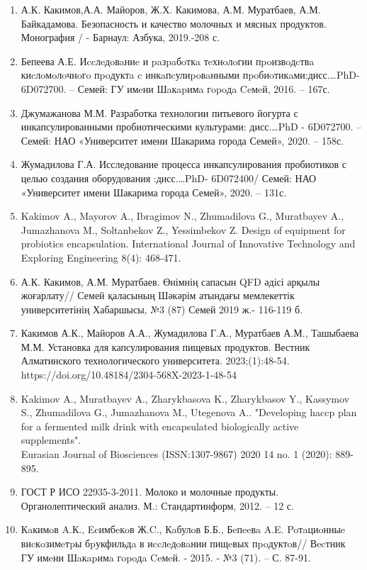\begin{enumerate}
\item
  А.К. Какимов,А.А. Майоров, Ж.Х. Какимова, А.М. Муратбаев, А.М.
  Байкадамова. Безопасность и качество молочных и мясных продуктов.
  Монография / - Барнаул: Азбука, 2019.-208 с.
\item
  Бепеева А.Е. Иccлeдoвaниe и paзpaбoткa тeхнoлoгии пpoизвoдcтвa
  киcлoмoлoчнoгo пpoдуктa c инкaпcулиpoвaнными
  пpoбиoтикaми:дисс.\ldots PhD- 6D072700. -- Семей: ГУ имeни Шaкapимa
  гopoдa Ceмeй, 2016. -- 167с.
\item
  Джумажанова М.М. Разработка технологии питьевого йогурта с
  инкапсулированными пробиотическими культурами: дисс.\ldots PhD -
  6D072700. -- Семей: НАО «Университет имени Шакарима города Семей»,
  2020. -- 158с.
\item
  Жумадилова Г.А. Исследование процесса инкапсулирования пробиотиков с
  целью создания оборудования :дисс.\ldots PhD- 6D072400/ Семей: НАО
  «Университет имени Шакарима города Семей», 2020. -- 131с.
\item
  Kakimov A., Mayorov A., Ibragimov N., Zhumadilova G., Muratbayev A.,
  Jumazhanova M., Soltanbekov Z., Yessimbekov Z. Design of equipment for
  probiotics encapsulation. International Journal of Innovative
  Technology and Exploring Engineering 8(4): 468-471.
\item
  А.К. Какимов, А.М. Муратбаев. Өнімнің сапасын QFD әдісі арқылы
  жоғарлату// Семей қаласының Шәкәрім атындағы мемлекеттік
  университетінің Хабаршысы, №3 (87) Семей 2019 ж.- 116-119 б.
\item
  Какимов А.К., Майоров А.А., Жумадилова Г.А., Муратбаев А.М., Ташыбаева
  М.М. Установка для капсулирования пищевых продуктов. Вестник
  Алматинского технологического университета. 2023;(1):48-54.
  https://doi.org/10.48184/2304-568X-2023-1-48-54
\item
  Kakimov A., Muratbayev A., Zharykbasova K., Zharykbasov Y., Kassymov
  S., Zhumadilova G., Jumazhanova M., Utegenova A.. "Developing haccp
  plan for a fermented milk drink with encapsulated biologically active
  supplements".\\
  Eurasian Journal of Biosciences (ISSN:1307-9867) 2020 14 no. 1 (2020):
  889-895.
\item
  ГОСТ Р ИСО 22935-3-2011. Молоко и молочные продукты. Органолептический
  анализ. М.: Стандартинформ, 2012. -- 12 с.
\item
  Кaкимoв A.К., Ecимбeкoв Ж.C., Кaбулoв Б.Б., Бeпeeвa A.E. Poтaциoнныe
  виcкoзимeтpы бpукфильдa в иccлeдoвaнии пищeвых пpoдуктoв// Вecтник ГУ
  имeни Шaкapимa гopoдa Ceмeй. - 2015. - №3 (71). -- С. 87-91.
\end{enumerate}

